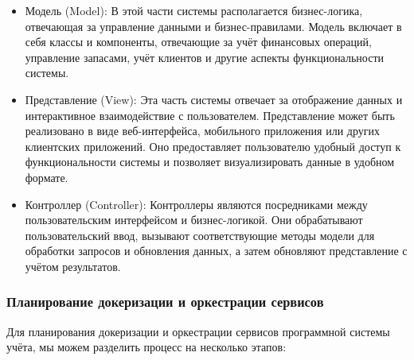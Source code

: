 \begin{itemize}
	\item Модель (Model): В этой части системы располагается бизнес-логика, отвечающая за управление данными и бизнес-правилами. Модель включает в себя классы и компоненты, отвечающие за учёт финансовых операций, управление запасами, учёт клиентов и другие аспекты функциональности системы.
	\item Представление (View): Эта часть системы отвечает за отображение данных и интерактивное взаимодействие с пользователем. Представление может быть реализовано в виде веб-интерфейса, мобильного приложения или других клиентских приложений. Оно предоставляет пользователю удобный доступ к функциональности системы и позволяет визуализировать данные в удобном формате.
	\item Контроллер (Controller): Контроллеры являются посредниками между пользовательским интерфейсом и бизнес-логикой. Они обрабатывают пользовательский ввод, вызывают соответствующие методы модели для обработки запросов и обновления данных, а затем обновляют представление с учётом результатов.
\end{itemize}


\subsubsection{Планирование докеризации и оркестрации сервисов}

Для планирования докеризации и оркестрации сервисов программной системы учёта, мы можем разделить процесс на несколько этапов:

